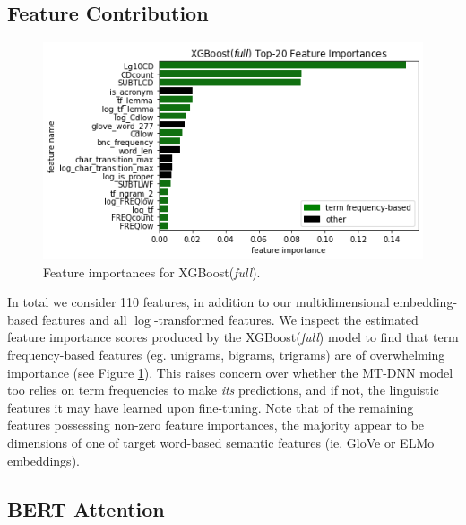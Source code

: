\documentclass[11pt,a4paper]{article}
\begin{document}
\subsection{Feature Contribution}

\begin{figure}
  \centering
  \includegraphics[scale=0.45]{xgboost_feature_importances.png}
  \captionsetup{justification=centering}
  \caption{\label{fig:xgboost_feature_importance} Feature importances for XGBoost(\textit{full}).}
\end{figure}

In total we consider 110 features, in addition to our multidimensional embedding-based features and all $\log$-transformed features. We inspect the estimated feature importance scores produced by the XGBoost(\textit{full}) model to find that term frequency-based features (eg. unigrams, bigrams, trigrams) are of overwhelming importance (see Figure \ref{fig:xgboost_feature_importance}). This raises concern over whether the MT-DNN model too relies on term frequencies to make \textit{its} predictions, and if not, the linguistic features it may have learned upon fine-tuning. Note that of the remaining features possessing non-zero feature importances, the majority appear to be dimensions of one of target word-based semantic features (ie. GloVe or ELMo embeddings).

\subsection{BERT Attention}
\end{document}
